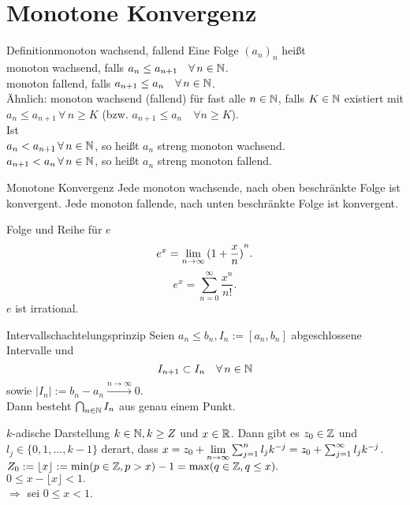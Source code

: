 \documentclass[main.tex]{subfiles}
\begin{document}
\section*{Monotone Konvergenz}
\begin{karte}{Definitionmonoton wachsend, fallend}
    Eine Folge \({(a_n)}_n\) heißt \\
    monoton wachsend, falls 
    \(a_n\leq a_{n+1} \quad \forall n\in\N \).\\
    monoton fallend, falls \(a_{n+1} \leq 
    a_n \quad \forall n\in\N \).\\
    Ähnlich: monoton wachsend (fallend) 
    für fast alle \(n\in\mathbb{N} \), falls \( K\in\mathbb{N} \) 
    existiert mit \( a_n\leq a_{n+1} \, 
    \forall \, n\geq K \) (bzw. \( a_{n+1}
    \leq a_n \quad \forall n\geq K \)).\\
	Ist \\
    \( a_n<a_{n+1} \, \forall n\in\N \), 
    so heißt \(a_n\) streng monoton wachsend.\\
    \( a_{n+1}<a_n \, \forall n\in\N \), 
    so heißt \(a_n\) streng monoton fallend.
\end{karte}
\begin{karte}{Monotone Konvergenz}
    Jede monoton wachsende, nach oben beschränkte 
    Folge ist konvergent. Jede monoton fallende, 
    nach unten beschränkte Folge ist konvergent.
\end{karte}
\begin{karte}{Folge und Reihe für \(e\)}
    \[ e^x = \lim\limits_{n\rightarrow\infty} {(1+\frac{x}{n})}^n. \]
    \[ e^x = \sum_{n=0}^\infty \frac{x^n}{n!}. \]
    \( e \) ist irrational.
\end{karte}
\begin{karte}{Intervallschachtelungsprinzip}
    Seien \( a_n\leq b_n, I_n := [a_n,b_n] \) 
    abgeschlossene Intervalle und 
    \[I_{n+1} \subset I_n \quad \forall n\in\N \]
    sowie \( |I_n| := b_n - a_n 
    \overset{n\rightarrow\infty}{\rightarrow} 0 \).\\
	Dann besteht \(\bigcap_{n\in\mathbb{N}} I_n\) aus genau einem Punkt.\\
\end{karte}
\begin{karte}{\(k\)-adische Darstellung}
    \(k\in\mathbb{N}, k\geq Z\) und \(x\in\mathbb{R} \). 
    Dann gibt es \(z_0\in \mathbb{Z} \) und 
    \(l_j \in \{0,1,\ldots,k-1\} \) derart, 
    dass \(x = z_0 + \lim\limits_{n\rightarrow\infty} \sum_{j=1}^{n} 
    l_j k^{-j} = z_0 + \sum_{j=1}^{\infty} l_j k^{-j} \).\\
    \(Z_0 := \lfloor x \rfloor := \min(p\in\mathbb{Z}, p>x) -1 
    = \max(q\in\mathbb{Z}, q\leq x). \) \\
	\( 0\leq x-\lfloor x\rfloor <1. \) \\
    \( \Rightarrow \) \obda{} sei 
    \( 0\leq x<1 \).
\end{karte}
\end{document}
